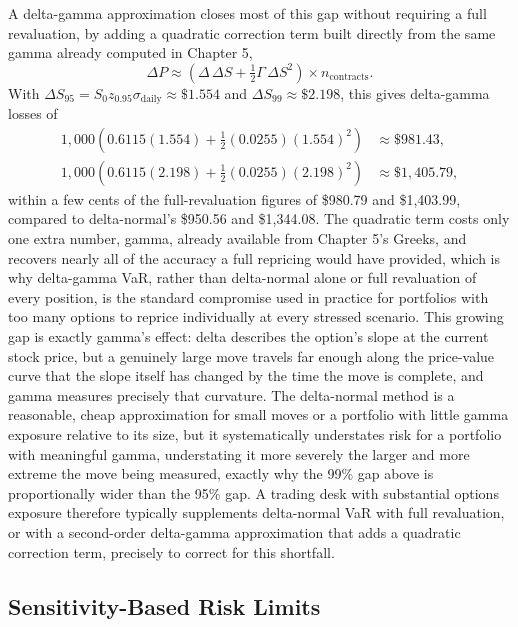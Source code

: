 \documentclass[../ai_in_finance]{subfiles}
\begin{document}
A delta-gamma approximation closes most of this gap without requiring a full revaluation, by adding a quadratic correction term built directly from the same gamma already computed in Chapter 5,
\begin{equation*}
\Delta P \approx \left(\Delta \, \Delta S + \tfrac{1}{2}\Gamma \, \Delta S^2\right) \times n_{\text{contracts}}.
\end{equation*}
With $\Delta S_{95} = S_0 z_{0.95}\sigma_{\text{daily}} \approx \$1.554$ and $\Delta S_{99} \approx \$2.198$, this gives delta-gamma losses of
\begin{align*}
1{,}000\left(0.6115(1.554) + \tfrac{1}{2}(0.0255)(1.554)^2\right) &\approx \$981.43, \\
1{,}000\left(0.6115(2.198) + \tfrac{1}{2}(0.0255)(2.198)^2\right) &\approx \$1{,}405.79,
\end{align*}
within a few cents of the full-revaluation figures of \$980.79 and \$1,403.99, compared to delta-normal's \$950.56 and \$1,344.08. The quadratic term costs only one extra number, gamma, already available from Chapter 5's Greeks, and recovers nearly all of the accuracy a full repricing would have provided, which is why delta-gamma VaR, rather than delta-normal alone or full revaluation of every position, is the standard compromise used in practice for portfolios with too many options to reprice individually at every stressed scenario.
This growing gap is exactly gamma's effect: delta describes the option's slope at the current stock price, but a genuinely large move travels far enough along the price-value curve that the slope itself has changed by the time the move is complete, and gamma measures precisely that curvature.
The delta-normal method is a reasonable, cheap approximation for small moves or a portfolio with little gamma exposure relative to its size, but it systematically understates risk for a portfolio with meaningful gamma, understating it more severely the larger and more extreme the move being measured, exactly why the 99\% gap above is proportionally wider than the 95\% gap. A trading desk with substantial options exposure therefore typically supplements delta-normal VaR with full revaluation, or with a second-order delta-gamma approximation that adds a quadratic correction term, precisely to correct for this shortfall.

\subsection{Sensitivity-Based Risk Limits}
\label{sec:sensitivity-limits}
\end{document}

